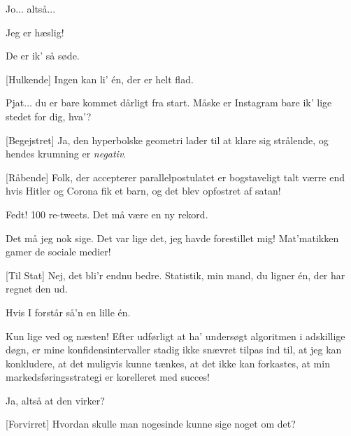 \documentclass[a4paper,11pt]{article}
\begin{document}
\begin{sketch}
 Jo... altså...

 Jeg er hæslig!


 De er ik' så søde.

[Hulkende] Ingen kan li' én, der er helt flad.

 Pjat... du er bare kommet dårligt fra start. Måske er Instagram bare ik' lige stedet for dig, hva'?

[Begejstret] Ja, den hyperbolske geometri lader til at klare sig strålende, og hendes krumning er \emph{negativ}.

[Råbende] Folk, der accepterer parallelpostulatet er bogstaveligt talt værre end hvis Hitler og Corona fik et barn, og det blev opfostret af satan!


 Fedt! 100 re-tweets. Det må være en ny rekord.

 Det må jeg nok sige. Det var lige det, jeg havde forestillet mig! Mat'matikken gamer de sociale medier!


[Til Stat] Nej, det bli'r endnu bedre. Statistik, min mand, du ligner én, der har regnet den ud.


 Hvis I forstår så'n en lille én.


 Kun lige ved og næsten! Efter udførligt at ha' undersøgt algoritmen i adskillige døgn, er mine konfidensintervaller stadig ikke snævret tilpas ind til, at jeg kan konkludere, at det muligvis kunne tænkes, at det ikke kan forkastes, at min markedsføringsstrategi er korelleret med succes!

 Ja, altså at den virker?

[Forvirret] Hvordan skulle man nogesinde kunne sige noget om det?


\end{sketch}
\end{document}

